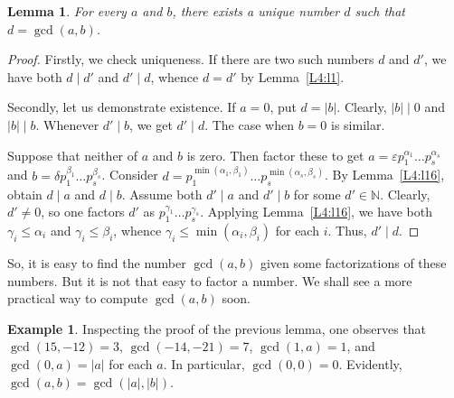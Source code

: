 \documentclass[12pt,notitlepage]{article}
\theoremstyle{plain}
\newtheorem{lemma}[thm]{Lemma}
\theoremstyle{definition}
\newtheorem{exm}[thm]{Example}
\theoremstyle{plain}
\newcommand{\N}{\mathbb{N}}
\newcommand{\eps}{\varepsilon}
\newcommand{\1}{\mathbf{1}}
\newcommand{\0}{\mathbf{0}}
\newcommand{\dvd}{\mathop{\mid}}
\begin{document}
\begin{lemma}
For every $a$ and $b$, there exists a unique number $d$ such that \ $d = \gcd(a,b)$.
\end{lemma}
\begin{proof}
Firstly, we check uniqueness. If there are two such numbers $d$ and $d'$, we have both $d \dvd d'$ and $d' \dvd d$, whence $d = d'$ by Lemma~\ref{L4:l1}.

Secondly, let us demonstrate existence. If $a = 0$, put $d = |b|$. Clearly, $|b| \dvd 0$ and $|b| \dvd b$. Whenever $d' \dvd b$, we get $d' \dvd d$. The case when $b = 0$ is similar.

Suppose that neither of $a$ and $b$ is zero. Then factor these to get $a = \eps p^{\alpha_1}_1\ldots p^{\alpha_s}_s$ and $b = \delta p^{\beta_1}_1\ldots p^{\beta_s}_s$. Consider $d = p^{\min(\alpha_1, \beta_1)}_1\ldots p^{\min(\alpha_s, \beta_s)}_s$. By Lemma~\ref{L4:l16}, obtain $d \dvd a$ and $d \dvd b$. Assume both $d' \dvd a$ and $d' \dvd b$ for some $d'  \in \N$. Clearly, $d' \neq 0$, so one factors $d'$ as $p^{\gamma_1}_1\ldots p^{\gamma_s}_s$. Applying Lemma~\ref{L4:l16}, we have both $\gamma_i \leq \alpha_i$ and $\gamma_i \leq \beta_i$, whence $\gamma_i \leq \min(\alpha_i, \beta_i)$ for each $i$. Thus, $d' \dvd d$.
\end{proof}

So, it is easy to find the number $\gcd(a, b)$ given some factorizations of these numbers. But it is not that easy to factor a number. We shall see a more practical way to compute $\gcd(a, b)$ soon.

\begin{exm}
Inspecting the proof of the previous lemma, one observes that $\gcd(15, -12) = 3$, $\gcd(-14, -21) = 7$, $\gcd(1, a) = 1$, and $\gcd(0, a) = |a|$ for each $a$. In particular, $\gcd(0, 0) = 0$. Evidently, $\gcd(a, b) = \gcd(|a|,|b|)$.
\end{exm}
\end{document}
